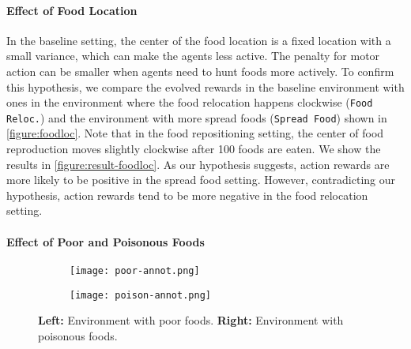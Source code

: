 \paragraph{Effect of Food Location}
In the baseline setting, the center of the food location is a fixed location with a small variance, which can make the agents less active. The penalty for motor action can be smaller when agents need to hunt foods more actively. To confirm this hypothesis, we compare the evolved rewards in the baseline environment with ones in the environment where the food relocation happens clockwise (\texttt{Food Reloc.}) and the environment with more spread foods (\texttt{Spread Food}) shown in \cref{figure:foodloc}. Note that in the food repositioning setting, the center of food reproduction moves slightly clockwise after 100 foods are eaten. We show the results in \cref{figure:result-foodloc}. As our hypothesis suggests, action rewards are more likely to be positive in the spread food setting. However, contradicting our hypothesis, action rewards tend to be more negative in the food relocation setting.

\paragraph{Effect of Poor and Poisonous Foods}

\begin{figure}[ht]
  \begin{subfigure}[t]{4cm}
    \centering
    \texttt{[image: poor-annot.png]}
  \end{subfigure}
  \begin{subfigure}[t]{4cm}
    \centering
    \texttt{[image: poison-annot.png]}
  \end{subfigure}
  \caption{
    \textbf{Left:} Environment with poor foods.
    \textbf{Right:} Environment with poisonous foods.
  }\label{figure:pp}
\end{figure}

